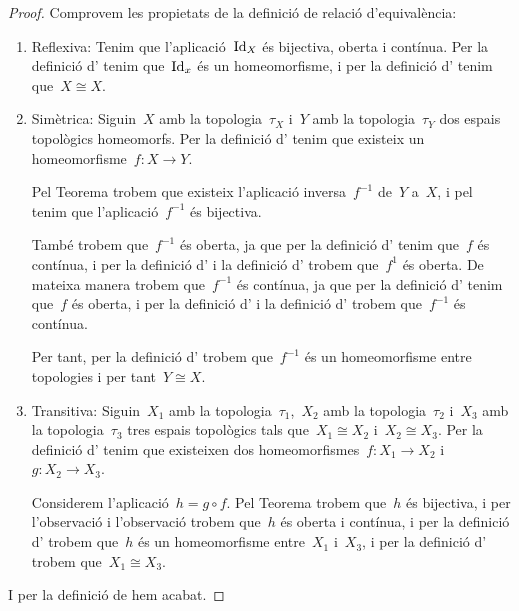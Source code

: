 \documentclass[../../main.tex]{subfiles}
\begin{document}
    \begin{proof}
        Comprovem les propietats de la definició de relació d'equivalència:
        \begin{enumerate}
            \item Reflexiva: Tenim que l'aplicació~\(\operatorname{Id}_{X}\) és bijectiva, oberta i contínua.
            Per la definició d' tenim que~\(\operatorname{Id}_{x}\) és un homeomorfisme, i per la definició d' tenim que~\(X\cong X\).
            \item Simètrica: Siguin~\(X\) amb la topologia~\(\tau_{X}\) i~\(Y\) amb la topologia~\(\tau_{Y}\) dos espais topològics homeomorfs.
            Per la definició d' tenim que existeix un homeomorfisme~\(f\colon X\longrightarrow Y\).

            Pel Teorema  trobem que existeix l'aplicació inversa~\(f^{-1}\) de~\(Y\) a~\(X\), i pel \corollari{}  tenim que l'aplicació~\(f^{-1}\) és bijectiva.

            També trobem que~\(f^{-1}\) és oberta, ja que per la definició d' tenim que~\(f\) és contínua, i per la definició d' i la definició d' trobem que~\(f^{1}\) és oberta.
            De mateixa manera trobem que~\(f^{-1}\) és contínua, ja que per la definició d' tenim que~\(f\) és oberta, i per la definició d' i la definició d' trobem que~\(f^{-1}\) és contínua.

            Per tant, per la definició d' trobem que~\(f^{-1}\) és un homeomorfisme entre topologies i per tant~\(Y\cong X\).
            \item Transitiva: Siguin~\(X_{1}\) amb la topologia~\(\tau_{1}\),~\(X_{2}\) amb la topologia~\(\tau_{2}\) i~\(X_{3}\) amb la topologia~\(\tau_{3}\) tres espais topològics tals que~\(X_{1}\cong X_{2}\) i~\(X_{2}\cong X_{3}\).
            Per la definició d' tenim que existeixen dos homeomorfismes~\(f\colon X_{1}\longrightarrow X_{2}\) i~\(g\colon X_{2}\longrightarrow X_{3}\).

            Considerem l'aplicació~\(h=g\circ f\).
            Pel Teorema  trobem que~\(h\) és bijectiva, i per l'observació  i l'observació  trobem que~\(h\) és oberta i contínua, i per la definició d' trobem que~\(h\) és un homeomorfisme entre~\(X_{1}\) i~\(X_{3}\), i per la definició d' trobem que~\(X_{1}\cong X_{3}\).
        \end{enumerate}
        I per la definició de  hem acabat.
    \end{proof}
\end{document}

